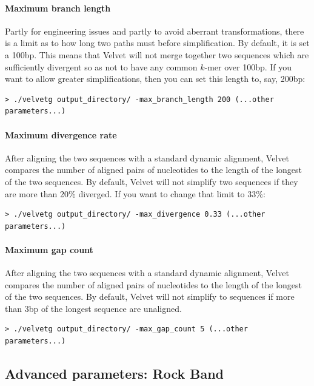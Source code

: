 \documentclass{article}
\begin{document}
\paragraph{Maximum branch length}

Partly for engineering issues and partly to avoid aberrant transformations, there is a limit as to how long two paths must before simplification. By default, it is set a 100bp. This means that Velvet will not merge together two sequences which are sufficiently divergent so as not to have any common $k$-mer over 100bp. If you want to allow greater simplifications, then you can set this length to, say, 200bp:

\begin{verbatim}
> ./velvetg output_directory/ -max_branch_length 200 (...other parameters...)
\end{verbatim} 

\paragraph{Maximum divergence rate}

After aligning the two sequences with a standard dynamic alignment, Velvet compares the number of aligned pairs of nucleotides to the length of the longest of the two sequences. By default, Velvet will not simplify two sequences if they are more than 20\% diverged. If you want to change that limit to 33\%:

\begin{verbatim}
> ./velvetg output_directory/ -max_divergence 0.33 (...other parameters...)
\end{verbatim} 

\paragraph{Maximum gap count}

After aligning the two sequences with a standard dynamic alignment, Velvet compares the number of aligned pairs of nucleotides to the length of the longest of the two sequences. By default, Velvet will not simplify to sequences if more than 3bp of the longest sequence are unaligned.

\begin{verbatim}
> ./velvetg output_directory/ -max_gap_count 5 (...other parameters...)
\end{verbatim} 

\subsection{Advanced parameters: Rock Band}
\end{document}
